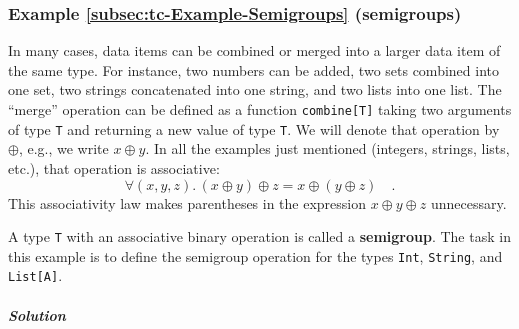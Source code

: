 \subsubsection{Example \label{subsec:tc-Example-Semigroups}\ref{subsec:tc-Example-Semigroups}
(semigroups)}

In many cases, data items can be combined or merged into a larger
data item of the same type. For instance, two numbers can be added,
two sets combined into one set, two strings concatenated into one
string, and two lists into one list. The \textsf{``}merge\textsf{''} operation can
be defined as a function \lstinline!combine[T]! taking two arguments
of type \lstinline!T! and returning a new value of type \lstinline!T!.
We will denote that operation by $\oplus$, e.g., we write $x\oplus y$.
In all the examples just mentioned (integers, strings, lists, etc.),
that operation is associative:
\begin{equation}
\forall(x,y,z).\,\left(x\oplus y\right)\oplus z=x\oplus\left(y\oplus z\right)\quad.\label{eq:associativity-law-semigroup}
\end{equation}
This associativity law makes
parentheses in the expression $x\oplus y\oplus z$ unnecessary.

A type \lstinline!T! with an associative binary operation is called
a \textbf{semigroup}.
The task in this example is to define the semigroup operation for
the types \lstinline!Int!, \lstinline!String!, and \lstinline!List[A]!.

\subparagraph{Solution}

